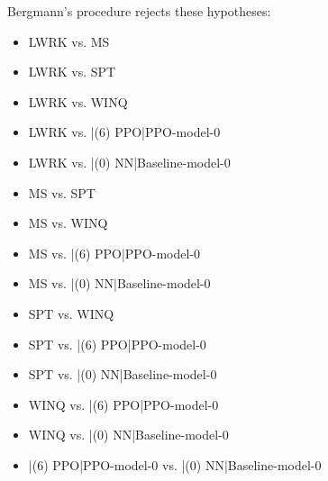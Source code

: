 \documentclass[a3paper,10pt]{article}
\begin{document}
Bergmann's procedure rejects these hypotheses:


\begin{itemize}


\item LWRK vs. MS
\item LWRK vs. SPT
\item LWRK vs. WINQ
\item LWRK vs. |(6) PPO|PPO-model-0
\item LWRK vs. |(0) NN|Baseline-model-0
\item MS vs. SPT
\item MS vs. WINQ
\item MS vs. |(6) PPO|PPO-model-0
\item MS vs. |(0) NN|Baseline-model-0
\item SPT vs. WINQ
\item SPT vs. |(6) PPO|PPO-model-0
\item SPT vs. |(0) NN|Baseline-model-0
\item WINQ vs. |(6) PPO|PPO-model-0
\item WINQ vs. |(0) NN|Baseline-model-0
\item |(6) PPO|PPO-model-0 vs. |(0) NN|Baseline-model-0
\end{itemize}
\end{document}
